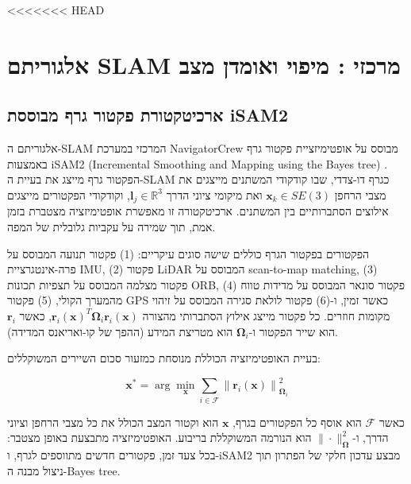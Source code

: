 <<<<<<< HEAD


\section{אלגוריתם SLAM מרכזי : מיפוי ואומדן מצב}
\label{sec:ch04_slam}

\subsection{ארכיטקטורת פקטור גרף מבוססת iSAM2}
\label{sec:ch04_factor_graph}

אלגוריתם ה-SLAM המרכזי במערכת NavigatorCrew מבוסס על אופטימיזציית פקטור גרף באמצעות iSAM2 (Incremental Smoothing and Mapping using the Bayes tree) \cite{Kaess2012iSAM2}. הפקטור גרף מייצג את בעיית ה-SLAM כגרף דו-צדדי, שבו קודקודי המשתנים מייצגים את מצבי הרחפן $\mathbf{x}_k \in SE(3)$ ואת מיקומי ציוני הדרך $\mathbf{l}_j \in \mathbb{R}^3$, וקודקודי הפקטורים מייצגים אילוצים הסתברותיים בין המשתנים. ארכיטקטורה זו מאפשרת אופטימיזציה מצטברת בזמן אמת, תוך שמירה על עקביות גלובלית של המפה.

הפקטורים בפקטור הגרף כוללים שישה סוגים עיקריים: (1) פקטור תנועה המבוסס על פרה-אינטגרציית IMU, (2) פקטור LiDAR המבוסס על scan-to-map matching, (3) פקטור מצלמה המבוסס על תצפיות תכונות ORB, (4) פקטור סונאר המבוסס על מדידות טווח מהמערך הקולי, (5) פקטור GPS כאשר זמין, ו-(6) פקטור לולאת סגירה המבוסס על זיהוי מקומות חוזרים. כל פקטור מייצג אילוץ הסתברותי מהצורה $\mathbf{r}_i(\mathbf{x})^T \mathbf{\Omega}_i \mathbf{r}_i(\mathbf{x})$, כאשר $\mathbf{r}_i$ הוא שייר הפקטור ו-$\mathbf{\Omega}_i$ הוא מטריצת המידע (ההפך של קו-ואריאנס המדידה).

בעיית האופטימיזציה הכוללת מנוסחת כמזעור סכום השיירים המשוקללים:

\begin{equation}
\mathbf{x}^* = \arg\min_{\mathbf{x}} \sum_{i \in \mathcal{F}} \left\| \mathbf{r}_i(\mathbf{x}) \right\|_{\mathbf{\Omega}_i}^2
\label{eq:ch04_factor_graph}
\end{equation}

כאשר $\mathcal{F}$ הוא אוסף כל הפקטורים בגרף, $\mathbf{x}$ הוא וקטור המצב הכולל את כל מצבי הרחפן וציוני הדרך, ו-$\|\cdot\|_{\mathbf{\Omega}}^2$ הוא הנורמה המשוקללת בריבוע. האופטימיזציה מתבצעת באופן מצטבר: בכל צעד זמן, פקטורים חדשים מתווספים לגרף, ו-iSAM2 מבצע עדכון חלקי של הפתרון תוך ניצול מבנה ה-Bayes tree.


